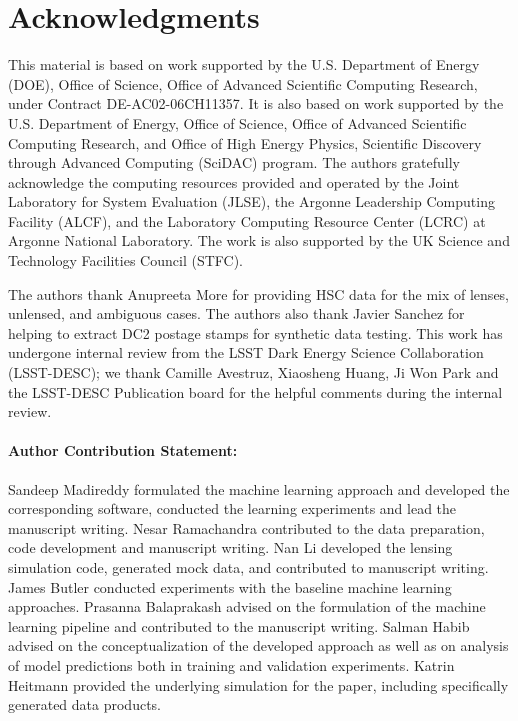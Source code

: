 \documentclass[12pt, twocolumn, apj]{openjournal}
\begin{document}
\section*{Acknowledgments}

This material is based on work supported by the U.S. Department of Energy (DOE), Office of Science, Office of Advanced Scientific Computing Research, under Contract DE-AC02-06CH11357. It is also based on work supported by the U.S. Department of Energy, Office of Science, Office of Advanced Scientific Computing Research, and Office of High Energy Physics, Scientific Discovery through Advanced Computing (SciDAC) program. The authors gratefully acknowledge the computing resources provided and operated by the Joint Laboratory for System Evaluation (JLSE), the Argonne Leadership Computing Facility (ALCF), and the Laboratory Computing Resource Center (LCRC) at Argonne National Laboratory. The work is also supported by the UK Science and Technology Facilities Council (STFC).

The authors thank Anupreeta More for providing HSC data for the mix of lenses, unlensed, and ambiguous cases. The authors also thank Javier Sanchez for helping to extract DC2 postage stamps for synthetic data testing. 
This work has undergone internal review from the LSST Dark Energy Science Collaboration (LSST-DESC); we thank Camille Avestruz, Xiaosheng Huang, Ji Won Park and the LSST-DESC Publication board for the helpful comments during the internal review. 

\paragraph{Author Contribution Statement:} Sandeep Madireddy formulated the machine learning approach and developed the corresponding software, conducted the learning experiments and lead the manuscript writing. Nesar Ramachandra contributed to the data preparation, code development and manuscript writing. Nan Li developed the lensing simulation code, generated mock data, and contributed to manuscript writing. James Butler conducted experiments with the baseline machine learning approaches. Prasanna Balaprakash advised on the formulation of the machine learning pipeline and contributed to the manuscript writing. Salman Habib advised on the conceptualization of the developed approach as well as on analysis of model predictions both in training and validation experiments. Katrin Heitmann provided the underlying simulation for the paper, including specifically generated data products.


\fontsize{9.0pt}{10.0pt} \selectfont



\end{document}
